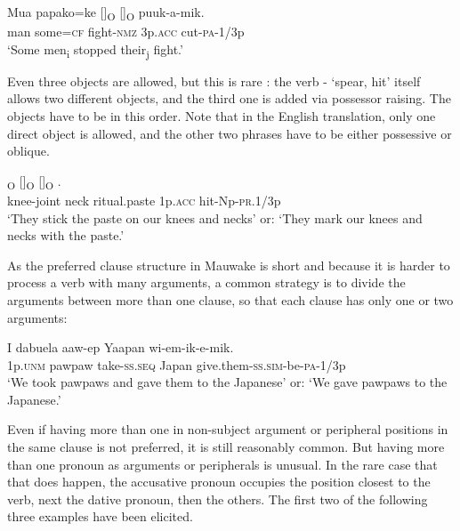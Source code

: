 \ea%
\label{ex:5:x949}
\gll Mua  papako=ke  []\textsubscript{O}  []\textsubscript{O}  puuk-a-mik. \\
     man  some=\textsc{cf}  fight-\textsc{nmz}  3p.\textsc{acc}  cut-\textsc{pa}-1/3p \\
\glt `Some men\textsubscript{i} stopped their\textsubscript{j} fight.'
\z

Even three objects are allowed, but this is rare : the verb - `spear, hit' itself allows two different objects, and the third one is added via possessor raising. The objects have to be in this order. Note that in the English translation, only one direct object is allowed, and the other two phrases have to be either possessive or oblique.

\ea%
\label{ex:5:x953}
\textsubscript{O}  []\textsubscript{O}  []\textsubscript{O}  . \\
     knee-joint  neck  ritual.paste  1p.\textsc{acc}  hit-Np-\textsc{pr}.1/3p \\
\glt `They stick the  paste on our knees and necks' or: `They mark our knees and necks with the  paste.'
\z

As the preferred clause structure in Mauwake is short and because it is harder to process a verb with many arguments, a common strategy is to divide the arguments between more than one clause, so that each clause has only one or two arguments:

\ea%
\label{ex:5:x967}
\gll I  dabuela  aaw-ep  Yaapan  wi-em-ik-e-mik. \\
     1p.\textsc{unm}  pawpaw  take-\textsc{ss}.\textsc{seq}  Japan  give.them-\textsc{ss}.\textsc{sim}-be-\textsc{pa}-1/3p \\
\glt `We took pawpaws and gave them to the Japanese' or: `We gave pawpaws to the Japanese.'
\z

Even if having more than one  in non-subject argument or peripheral positions in the same clause is not preferred, it is still reasonably common. But having more than one pronoun as arguments or peripherals is unusual. In the rare case that that does happen, the accusative pronoun occupies the position closest to the verb, next the dative pronoun, then the others. The first two of the following three examples have been elicited.

